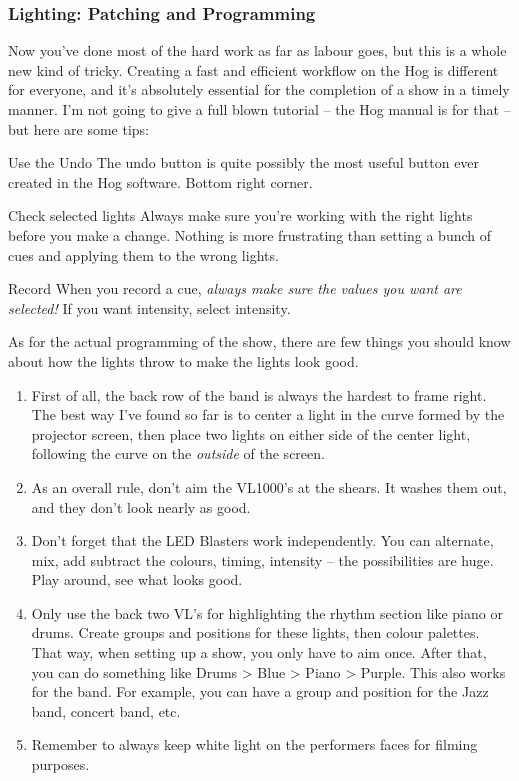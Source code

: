 \documentclass[letterpaper,10pt,oneside,headsepline]{scrreprt}
\begin{document}
\subsubsection{Lighting: Patching and Programming}
Now you've done most of the hard work as far as labour goes, but this is a whole new kind of tricky. Creating a fast and efficient workflow on the Hog is different for everyone, and it's absolutely essential for the completion of a show in a timely manner. I'm not going to give a full blown tutorial -- the Hog manual is for that -- but here are some tips:\\

\begin{compactdesc}
\item[Use the Undo] The undo button is quite possibly the most useful button ever created in the Hog software. Bottom right corner.
\item[Check selected lights] Always make sure you're working with the right lights before you make a change. Nothing is more frustrating than setting a bunch of cues and applying them to the wrong lights.
\item[Record] When you record a cue, \textit{always make sure the values you want are selected!} If you want intensity, select intensity.\\
\end{compactdesc}

As for the actual programming of the show, there are few things you should know about how the lights throw to make the lights look good. 

\begin{enumerate}
\item First of all, the back row of the band is always the hardest to frame right. The best way I've found so far is to center a light in the curve formed by the projector screen, then place two lights on either side of the center light, following the curve on the \textit{outside} of the screen.
\item As an overall rule, don't aim the VL1000's at the shears. It washes them out, and they don't look nearly as good.
\item Don't forget that the LED Blasters work independently. You can alternate, mix, add subtract the colours, timing, intensity -- the possibilities are huge. Play around, see what looks good. 
\item Only use the back two VL's for highlighting the rhythm section like piano or drums. Create groups and positions for these lights, then colour palettes. That way, when setting up a show, you only have to aim once. After that, you can do something like Drums > Blue > Piano > Purple. This also works for the band. For example, you can have a group and position for the Jazz band, concert band, etc.
\item Remember to always keep white light on the performers faces for filming purposes.
\end{enumerate}
\end{document}
